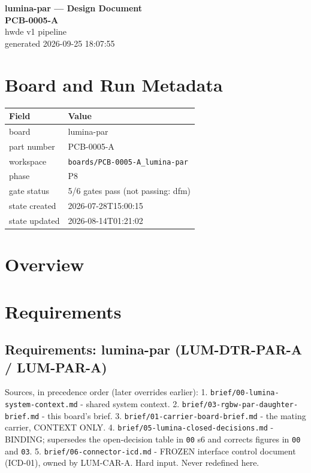 \documentclass[11pt,a4paper]{article}
\begin{document}
\sloppy
\begin{center}
{\LARGE\bfseries lumina-par --- Design Document}\\[6pt]
{\Large\bfseries PCB-0005-A}\\[6pt]
{\large hwde v1 pipeline}\\[2pt]
generated 2026-09-25 18:07:55
\end{center}
\tableofcontents

\section{Board and Run Metadata}
{\small
\begin{longtable}{lp{11cm}}
\toprule
\textbf{Field} & \textbf{Value} \\
\midrule
\endhead
board & lumina-par \\
part number & PCB-0005-A \\
workspace & \texttt{boards/PCB-0005-A\_lumina-par} \\
phase & P8 \\
gate status & 5/6 gates pass (not passing: dfm) \\
state created & 2026-07-28T15:00:15 \\
state updated & 2026-08-14T01:21:02 \\
\bottomrule
\end{longtable}
}
\section{Overview}
\section{Requirements}
\subsection*{Requirements: lumina-par (LUM-DTR-PAR-A / LUM-PAR-A)}
Sources, in precedence order (later overrides earlier): 1. \texttt{brief/00-lumina-system-context.md} - shared system context. 2. \texttt{brief/03-rgbw-par-daughter-brief.md} - this board's brief. 3. \texttt{brief/01-carrier-board-brief.md} - the mating carrier, CONTEXT ONLY. 4. \texttt{brief/05-lumina-closed-decisions.md} - BINDING; supersedes the open-decision table in \texttt{00} s6 and corrects figures in \texttt{00} and \texttt{03}. 5. \texttt{brief/06-connector-icd.md} - FROZEN interface control document (ICD-01), owned by LUM-CAR-A. Hard input. Never redefined here.
\end{document}

